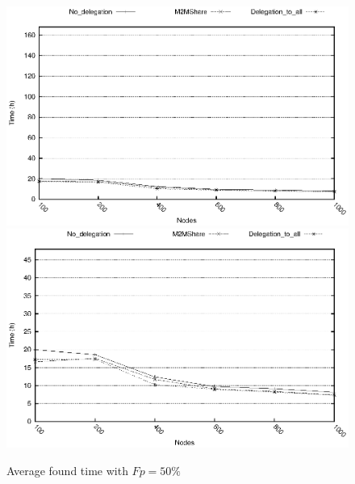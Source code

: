 \begin{figure}[htbp]
\centering%
\subfigure%
{\includegraphics{grafici/tempiVF_Fp50.eps}}\qquad\qquad
\subfigure%
{\includegraphics{grafici/tempiVF_Fp50_zoom.eps}}
\caption{Average found time with $Fp = 50\%$\label{graficiTempiVF_Fp50}}
\end{figure}



\newpage
